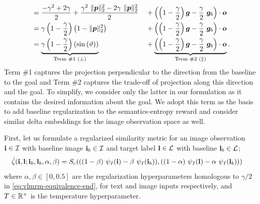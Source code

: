\begin{align}
    &= \dfrac{-\gamma^2 + 2\gamma}{2} + \dfrac{\gamma^2\ \norm{\bmp}^2_2 - 2 \gamma\ \norm{\bmp}^2_2}{2} &&+ \left(\left(1 - \dfrac{\gamma}{2}\right) \bmg - \dfrac{\gamma}{2}\ \bmg_b\right) \cdot \bmo\\ %
    &= \gamma\left(1 - \dfrac{\gamma}{2}\right)\left(1 -\norm{\bmp}^2_2\right) &&+ \left(\left(1 - \dfrac{\gamma}{2}\right) \bmg - \dfrac{\gamma}{2}\ \bmg_b\right) \cdot \bmo\\
    &= \underbrace{\gamma\left(1 - \dfrac{\gamma}{2}\right)\left(\sin\left(\vartheta\right)\right)}_{\text{Term \#1 (\(\perp\))}} &&+ \underbrace{\left(\left(1 - \dfrac{\gamma}{2}\right) \bmg - \dfrac{\gamma}{2}\ \bmg_b\right) \cdot \bmo}_{\text{Term \#2 (\(\parallel\))}}.
    \label{eq:vlmrm-equivalence-end}
\end{align}
Term \#1 captures the projection perpendicular to the direction from the baseline to the goal and Term \#2 captures the trade-off of projection along this direction and the goal.
To simplify, we consider only the latter in our formulation as it contains the desired information about the goal.
We adopt this term as the basis to add baseline regularization to the semantics-entropy reward and consider similar delta embeddings for the image observation space as well.

First, let us formulate a regularized similarity metric for an image observation \(\mathbf{i} \in \mathcal{I}\) with baseline image \(\mathbf{i}_b \in \mathcal{I}\) and target label \(\mathbf{l} \in \mathcal{L}\) with baseline \(\mathbf{l}_b \in \mathcal{L}\);
\begin{equation}
    \label{eq:clip-similarity-reg}
    \begin{split}
        \hat{\zeta}(\mathbf{i}, \mathbf{l}; \mathbf{i}_b, \mathbf{l}_b, \alpha, \beta)
        &= S_c(
            ((1 - \beta)\ \psi_I(\mathbf{i}) - \beta\ \psi_I(\mathbf{i}_b)),
            ((1 - \alpha)\ \psi_I(\mathbf{l}) - \alpha\ \psi_I(\mathbf{l}_b))
        )
    \end{split}
\end{equation}
where \(\alpha, \beta \in [0, 0.5]\) are the regularization hyperparameters homologous to \(\gamma / 2\) in \eqref{eq:vlmrm-equivalence-end}, for text and image inputs respectively, and \(T \in \mathbb{R}^+\) is the temperature hyperparameter.

